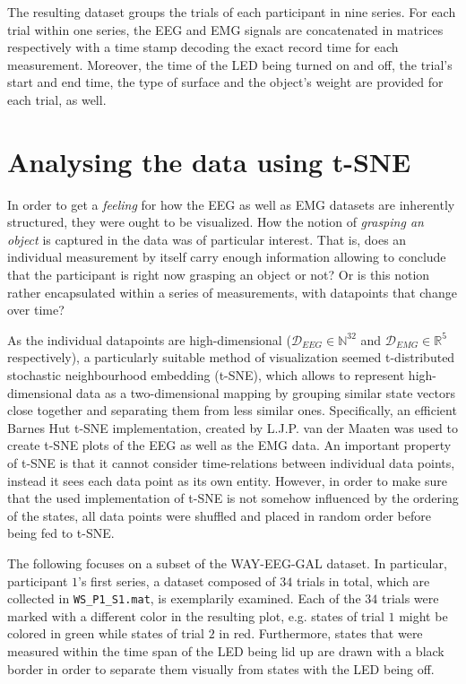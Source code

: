 \documentclass{article} %
\begin{document}
The resulting dataset groups the trials of each participant in nine series. For each trial within one series, the EEG and EMG signals are concatenated in matrices respectively with a time stamp decoding the exact record time for each measurement. Moreover, the time of the LED being turned on and off, the trial's start and end time, the type of surface and the object's weight are provided for each trial, as well. \cite{nature}




\section{Analysing the data using t-SNE}\label{sec:tsne}
In order to get a \emph{feeling} for how the EEG as well as EMG datasets are inherently structured, they were ought to be visualized. How the notion of \emph{grasping an object} is captured in the data was of particular interest. That is, does an individual measurement by itself carry enough information allowing to conclude that the participant is right now grasping an object or not? Or is this notion rather encapsulated within a series of measurements, with datapoints that change over time?

As the individual datapoints are high-dimensional ($\mathcal{D}_{EEG} \in \mathbb{N}^{32}$ and $\mathcal{D}_{EMG} \in \mathbb{R}^5$ respectively), a particularly suitable method of visualization seemed t-distributed stochastic neighbourhood embedding (t-SNE), which allows to represent high-dimensional data as a two-dimensional mapping by grouping similar state vectors close together and separating them from less similar ones. Specifically, an efficient Barnes Hut t-SNE implementation, created by L.J.P. van der Maaten \cite{tsne} was used to create t-SNE plots of the EEG as well as the EMG data. An important property of t-SNE is that it cannot consider time-relations between individual data points, instead it sees each data point as its own entity. However, in order to make sure that the used implementation of t-SNE is not somehow influenced by the ordering of the states, all data points were shuffled and placed in random order before being fed to t-SNE.

The following focuses on a subset of the WAY-EEG-GAL dataset. In particular, participant $1$'s first series, a dataset composed of $34$ trials in total, which are collected in \verb|WS_P1_S1.mat|, is exemplarily examined. Each of the $34$ trials were marked with a different color in the resulting plot, e.g. states of trial $1$ might be colored in green while states of trial $2$ in red. Furthermore, states that were measured within the time span of the LED being lid up are drawn with a black border in order to separate them visually from states with the LED being off.
\end{document}
